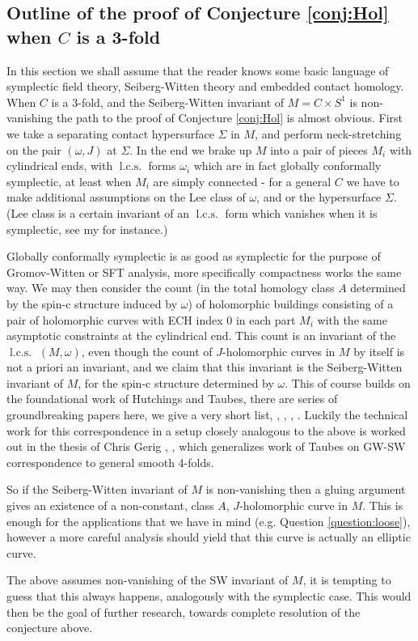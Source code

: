 \documentclass{amsart}
\numberwithin{equation}{section}
\theoremstyle{definition}
\theoremstyle{remark}
\DeclareMathOperator{\lcs}{l.c.s.}
\begin{document}
\subsection {Outline of the proof of Conjecture \ref{conj:Hol} when $C$ is a 3-fold}
In this section we shall assume that the reader knows some basic language of symplectic field theory, Seiberg-Witten theory and embedded contact homology. When $C$ is a 3-fold, and the Seiberg-Witten invariant of $M = C \times S ^{1} $ is non-vanishing the path to the proof of Conjecture \ref{conj:Hol} is almost obvious. First we take a separating contact hypersurface $\Sigma$ in $M$, and perform neck-stretching on the pair $(\omega, J)$ at $\Sigma$. In the end we brake up $M$ into a pair of pieces $M _{i} $ with cylindrical ends, with $\lcs$ forms $\omega _{i} $ which are in fact globally conformally symplectic,  at least when $M _{i} $ are simply connected - for a general $C$ we have to make additional assumptions on the Lee class of $\omega$, and or the hypersurface $\Sigma$. (Lee class is a certain invariant of an $\lcs$ form which vanishes when it is symplectic, see my \cite{citeSavelyevConformalSymplectic} for instance.)


Globally conformally symplectic is as good as symplectic for the purpose of Gromov-Witten or SFT analysis, more specifically compactness works the same way.
We may then consider the count (in the total homology class $A$ determined by the spin-c structure induced by $\omega$) of holomorphic buildings consisting of a pair of holomorphic curves with ECH index 0 in each part $M _{i} $ 
with the same asymptotic constraints at the cylindrical end. This count  is an invariant of the $\lcs$ $(M,\omega)$, even though the count of $J$-holomorphic curves in $M$ by itself is not a priori an invariant, and we claim that this invariant is the Seiberg-Witten invariant of $M$, for the spin-c structure determined by $\omega$.
This of course builds on the foundational work of Hutchings and Taubes, there are series of groundbreaking papers here, we give a very short list, \cite{citeHutchingsECHindex}, \cite{citeHutchingsSullivanRoundingCorners}, \cite{citeTaubesCountingPseudoHolomorphic}, \cite{citeTaubesWeinsteinconjecture}.
Luckily the technical work for this correspondence in a setup closely analogous to the above is worked out in the thesis of Chris Gerig \cite{citeGerigChrisTaming}, \cite{citeGerigChrisSW}, which generalizes work of Taubes on GW-SW correspondence to general smooth 4-folds.
 
So if the Seiberg-Witten invariant of $M$ is non-vanishing then a gluing argument gives an existence of a non-constant, class $A$, $J$-holomorphic curve in $M$. This is enough for the applications that we have in mind (e.g.
Question \ref{question:loose}), however a more careful analysis should yield that this curve is actually an elliptic curve.

The above assumes non-vanishing of the SW invariant of $M$, it is tempting to guess that this always happens, analogously with the symplectic case. This would then be the goal of further research, towards complete resolution of the conjecture above. 
  
   
%  
\end{document}
